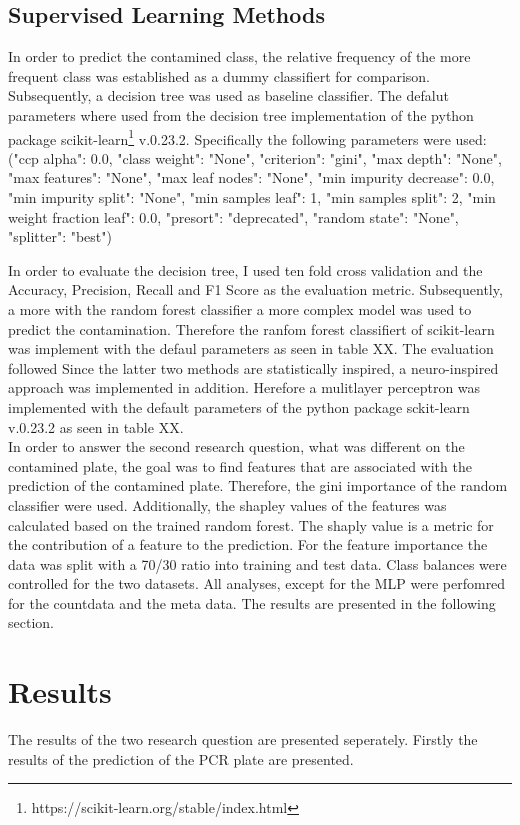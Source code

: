\documentclass{svproc}
\begin{document}
\subsection{Supervised Learning Methods}
In order to predict the contamined class, the relative frequency of the more frequent class was established as a dummy classifiert for comparison. Subsequently, a decision tree was used as baseline classifier. The defalut parameters where used from the decision tree implementation of the python package scikit-learn\footnote{https://scikit-learn.org/stable/index.html} v.0.23.2. Specifically the following parameters were used: ("ccp alpha": 0.0,
 "class weight": "None",
 "criterion": "gini",
 "max depth": "None",
 "max features": "None",
 "max leaf nodes": "None",
 "min impurity decrease": 0.0,
 "min impurity split": "None",
 "min samples leaf": 1,
 "min samples split": 2,
 "min weight fraction leaf": 0.0,
 "presort": "deprecated",
 "random state": "None",
 "splitter": "best")
 


In order to evaluate the decision tree, I used ten fold cross validation and the Accuracy, Precision, Recall and F1 Score as the evaluation metric.
Subsequently, a more with the random forest classifier a more complex model was used to predict the contamination. Therefore the ranfom forest classifiert of scikit-learn was implement with the defaul parameters as seen in table XX. The evaluation followed 
Since the latter two methods are statistically inspired, a neuro-inspired approach was implemented in addition. Herefore a mulitlayer perceptron was implemented with the default parameters of the python package sckit-learn v.0.23.2 as seen in table XX.\\


In order to answer the second research question, what was different on the contamined plate, the goal was to find features that are associated with the prediction of the contamined plate. Therefore, the gini importance of the random classifier were used. Additionally, the shapley values of the features was calculated based on the trained random forest. The shaply value is a metric for the contribution of a feature to the prediction. For the feature importance the data was split with a 70/30 ratio into training and test data. Class balances were controlled for the two datasets. All analyses, except for the MLP were perfomred for the countdata and the meta data. The results are presented in the following section.
\section{Results}
The results of the two research question are presented seperately. Firstly the results of the prediction of the PCR plate are presented.
\end{document}
